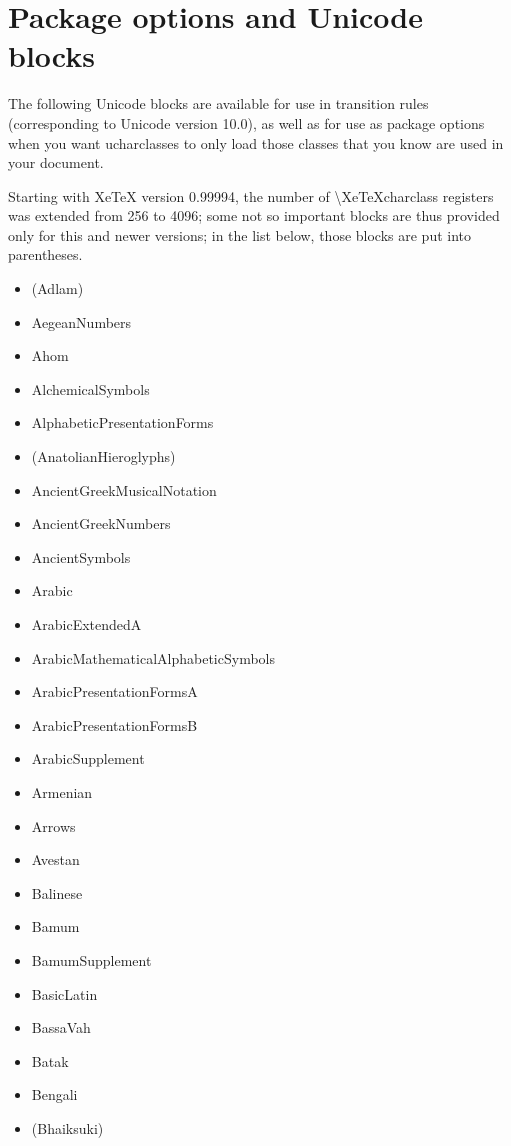 \documentclass{article}
\newenvironment{itemlist}{%
  \begin{itemize}
	\setlength{\itemsep}{0pt}
	\setlength{\parsep}{0pt}
	\setlength{\topsep}{0pt}
	\setlength{\partopsep}{0pt}
	\setlength{\parskip}{0pt}
	\setlength{\labelsep}{5pt}}%
{
  \end{itemize}}
\begin{document}
	\pagebreak
	\section{Package options and Unicode blocks}

		The following Unicode blocks are available for use in transition rules (corresponding to Unicode version 10.0), as well as for use as package options when you want ucharclasses to only load those classes that you know are used in your document.

		Starting with XeTeX version 0.99994, the number of \textbackslash XeTeXcharclass registers was extended from 256 to 4096; some not so important blocks are thus provided only for this and newer versions; in the list below, those blocks are put into parentheses.

		\begin{multicols*}{2}
			\begin{itemlist}
				\item (Adlam)
				\item AegeanNumbers
				\item Ahom
				\item AlchemicalSymbols
				\item AlphabeticPresentationForms
				\item (AnatolianHieroglyphs)
				\item AncientGreekMusicalNotation
				\item AncientGreekNumbers
				\item AncientSymbols
				\item Arabic
				\item ArabicExtendedA
				\item ArabicMathematicalAlphabeticSymbols
				\item ArabicPresentationFormsA
				\item ArabicPresentationFormsB
				\item ArabicSupplement
				\item Armenian
				\item Arrows
				\item Avestan
				\item Balinese
				\item Bamum
				\item BamumSupplement
				\item BasicLatin
				\item BassaVah
				\item Batak
				\item Bengali
				\item (Bhaiksuki)

\end{itemlist}
\end{multicols*}
\end{document}
